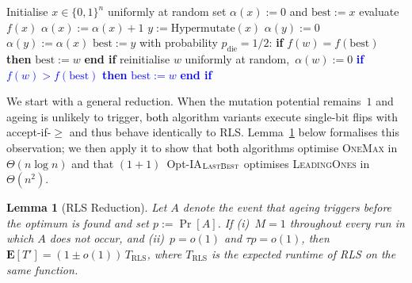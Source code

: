 \documentclass[lettersize,journal]{IEEEtran}
\newcommand{\new}[1]{\textcolor{black}{#1}}
\newcommand{\rev}[1]{\textcolor{blue}{#1}}
\newcommand{\lastBest}{$(1+1)$~Opt-IA$_{\textsc{LastBest}}$}
\newtheorem{lemma}{Lemma}
\begin{document}
\begin{algorithm}[t] 
 		\caption{$(1+1)$~Opt-IA$_{\textsc{FirstBest}}$ }
 		\begin{algorithmic}[1] \STATE Initialise $x \in\{0,1\}^n$ uniformly at random \STATE set $\alpha(x):=0$ and $\text{best}:=x$      
 			\STATE evaluate $f(x)$    
 			 \STATE $\alpha(x):=\alpha(x)+1$
 			\STATE $y:=\text{Hypermutate}(x)$
 			\STATE $\alpha(y):=0$
 			\ELSE
 			\STATE $\alpha(y):=\alpha(x)$
 			\ENDIF
 			\STATE $\text{best}:=y$
 			\ENDIF
 			\STATE with probability $p_{\text{die}}=1/2$:
 			\STATE \hspace{\algorithmicindent}
 			\textbf{if} $f(w) = f(\text{best})$ \textbf{then}
 			\STATE \hspace{2\algorithmicindent}
 			$\text{best}:=w$
 			\STATE \hspace{\algorithmicindent}
 			\textbf{end if}
 			\STATE \hspace{\algorithmicindent}
 			reinitialise $w$ uniformly at random,\ $\alpha(w):=0$
 			\textcolor{blue}{\STATE \hspace{\algorithmicindent}
 				\textbf{if} $f(w) > f(\text{best})$ \textbf{then}
 				\STATE \hspace{2\algorithmicindent}
 				$\text{best}:=w$
 				\STATE \hspace{\algorithmicindent}
 				\textbf{end if}}
 			\ENDIF
 			\ENDFOR
\rev{ 
\ENDIF}
 			\ENDWHILE
 		\end{algorithmic} 
 		\label{alg:alg2+ageing}
 	\end{algorithm}












We start with a general reduction.  When the mutation potential remains~$1$
and ageing is unlikely to trigger, \new{both} algorithm variants execute
single-bit flips with accept-if-$\geq$ and thus behave identically to RLS.
Lemma~\ref{lem:RLS-reduction} below formalises this observation;
we then apply it to show that \new{both} algorithms optimise
\textsc{OneMax} in $\Theta(n\log n)$ and that \lastBest{} optimises
\textsc{LeadingOnes} in $\Theta(n^2)$.

\begin{lemma}[RLS Reduction]\label{lem:RLS-reduction}
Let $A$ denote the event that ageing triggers before the optimum is found
and set $p:=\Pr[A]$.
If \emph{(i)}~$M=1$ throughout every run in which $A$ does not occur, and
\emph{(ii)}~$p=o(1)$ and $\tau p=o(1)$,
then $\mathbf{E}[T']=(1\pm o(1))\,T_{\mathrm{RLS}}$,
where $T_{\mathrm{RLS}}$ is the expected runtime of RLS
 on the same function.
\end{lemma}
\end{document}
